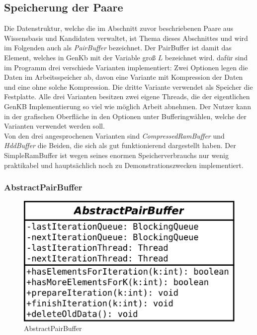 \documentclass[12pt,a4paper]{article}
\begin{document}
\subsection{Speicherung der Paare}
\label{sec:pairbuffer}

Die Datenstruktur, welche die im Abschnitt zuvor beschriebenen Paare aus Wissensbasis und Kandidaten verwaltet, ist Thema dieses Abschnittes und wird im Folgenden auch als  \textit{PairBuffer} bezeichnet. Der PairBuffer ist damit das Element, welches in GenKb mit der Variable groß $L$ bezeichnet wird. dafür sind im Programm drei verschiede Varianten implementiert: Zwei Optionen legen die Daten im Arbeitsspeicher ab, davon eine Variante mit Kompression der Daten und eine ohne solche Kompression. Die dritte Variante verwendet als Speicher die Festplatte. Alle drei Varianten besitzen zwei eigene Threads, die der eigentlichen GenKB Implementierung so viel wie möglich Arbeit abnehmen. Der Nutzer kann in der grafischen Oberfläche in den Optionen unter \glqq Buffering\grqq \space wählen, welche der Varianten verwendet werden soll. \\
Von den drei angesprochenen Varianten  sind \textit{CompressedRamBuffer} und \textit{HddBuffer} die Beiden, die sich als gut funktionierend dargestellt haben. Der SimpleRamBuffer ist wegen seines enormen Speicherverbrauchs nur wenig praktikabel und hauptsächlich noch zu Demonstrationszwecken implementiert.

\subsubsection{AbstractPairBuffer}
\label{sec:abstractbuffer}

\begin{figure}
\includegraphics[width=0.45\linewidth]{bilder/AbstractPairBuffer.png}
\caption{AbstractPairBuffer}
\label{pic:abstractpairbuffer}
\end{figure}
\end{document}

